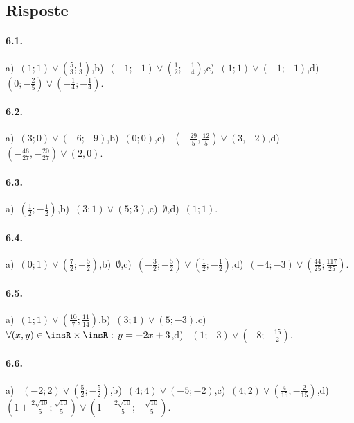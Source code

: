\subsection{Risposte}
\paragraph{6.1.} a)~$\left(1;1\right)\vee \left(\frac 5 3;\frac 1 3\right)$,\quad b)~$\left(-1;-1\right)\vee \left(\frac 1 2;-\frac 1 4\right)$,\quad c)~$\left(1;1\right)\vee \left(-1;-1\right)$,\quad d)~$\left(0;-\frac 2 5\right)\vee \left(-\frac 1 4;-\frac 1 4\right)$.

\paragraph{6.2.} a)~$\left(3;0\right)\vee \left(-6;-9\right)$,\quad b)~$\left(0;0\right)$,\quad c)~ $\left(-\frac{29} 5,\frac{12} 5\right)\vee (3,-2)$,\quad d)~$\left(-\frac{46}{27},-\frac{20}{27}\right)\vee (2,0)$.

\paragraph{6.3.} a)~$\left(\frac 1 2;-\frac 1 2\right)$,\quad b)~$\left(3;1\right)\vee \left(5;3\right)$,\quad c)~$\emptyset $,\quad d)~$\left(1;1\right)$.

\paragraph{6.4.} a)~$\left(0;1\right)\vee \left(\frac 7 2;-\frac 5 2\right)$,\quad b)~$\emptyset $,\quad c)~$\left(-\frac 3 2;-\frac 5 2\right)\vee \left(\frac 1 2;-\frac 1 2\right)$,\quad d)~$\left(-4;-3\right)\vee \left(\frac{44}{25};\frac{117}{25}\right)$.

\paragraph{6.5.} a)~$\left(1;1\right)\vee \left(\frac{10} 7;\frac{11}{14}\right)$,\quad b)~$\left(3;1\right)\vee \left(5;-3\right)$,\quad c)~$ \forall (x,y)\in \insR \times \insR:\,y=-2x+3$,\quad d)~ $\left(1;-3\right)\vee \left(-8;-\frac{15} 2\right)$.

\paragraph{6.6.} a)~ $\left(-2;2\right)\vee \left(\frac 5 2;-\frac 5 2\right)$,\quad b)~$\left(4;4\right)\vee \left(-5;-2\right)$,\quad c)~$\left(4;2\right)\vee \left(\frac 4{15};-\frac 2{15}\right)$,\quad d)~$\left(1+\frac{2\sqrt{10}} 5;\frac{\sqrt{10}} 5\right)\vee \left(1-\frac{2\sqrt{10}} 5;-\frac{\sqrt{10}} 5\right)$.

